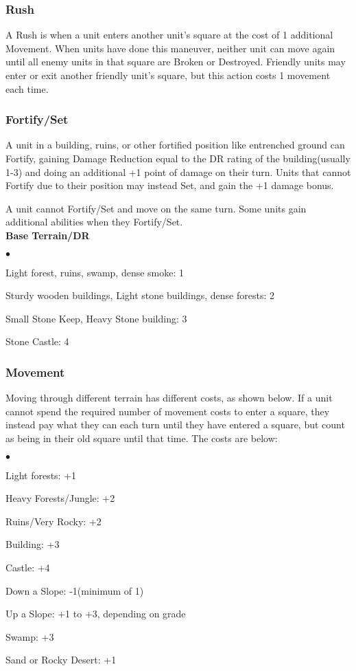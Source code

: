\subsubsection{Rush} A Rush is when a unit enters another unit's square at the cost of 1 additional Movement. When units have done this maneuver, neither unit can move again until all enemy units in that square are Broken or Destroyed. Friendly units may enter or exit another friendly unit's square, but this action costs 1 movement each time.

\subsubsection{Fortify/Set} A unit in a building, ruins, or other fortified position like entrenched ground can Fortify, gaining Damage Reduction equal to the DR rating of the building(usually 1-3) and doing an additional +1 point of damage on their turn. Units that cannot Fortify due to their position may instead Set, and gain the +1 damage bonus.

A unit cannot Fortify/Set and move on the same turn. Some units gain additional abilities when they Fortify/Set.\\

\noindent \textbf{Base Terrain/DR}

\begin{list}{$\bullet$}{\itemspace}
\item Light forest, ruins, swamp, dense smoke: 1
\item Sturdy wooden buildings, Light stone buildings, dense forests: 2
\item Small Stone Keep, Heavy Stone building: 3
\item Stone Castle: 4
\end{list}

\subsubsection{Movement} Moving through different terrain has different costs, as shown below. If a unit cannot spend the required number of movement costs to enter a square, they instead pay what they can each turn until they have entered a square, but count as being in their old square until that time. The costs are below:

\begin{list}{$\bullet$}{\itemspace}
     \item Light forests: +1
     \item Heavy Forests/Jungle: +2
     \item Ruins/Very Rocky: +2
     \item Building: +3
     \item Castle: +4
     \item Down a Slope: -1(minimum of 1)
     \item Up a Slope: +1 to +3, depending on grade
     \item Swamp: +3
     \item Sand or Rocky Desert: +1
\end{list}



